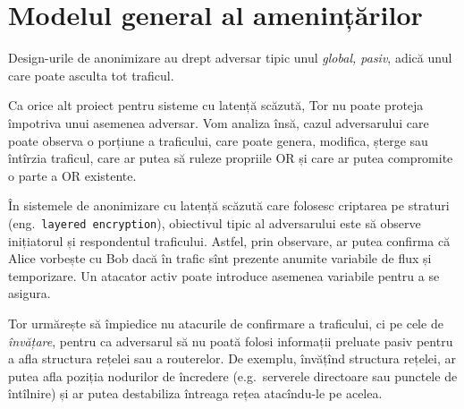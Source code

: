 
\section{Modelul general al amenințărilor}

\indent\indent Design-urile de anonimizare au drept adversar tipic
unul \emph{global, pasiv}, adică unul care poate asculta tot traficul.
 

Ca orice alt proiect pentru sisteme cu latență scăzută, Tor nu
poate proteja împotriva unui asemenea adversar. Vom analiza însă, cazul
adversarului care poate observa o porțiune a traficului, care poate genera,
modifica, șterge sau întîrzia traficul, care ar putea să ruleze propriile OR
și care ar putea compromite o parte a OR existente.

În sistemele de anonimizare cu latență scăzută care folosesc criptarea
pe straturi (eng.\ \texttt{layered encryption}), 
obiectivul tipic al adversarului este să observe inițiatorul și respondentul
traficului. Astfel, prin observare, ar putea confirma că Alice vorbește cu Bob
dacă în trafic sînt prezente anumite variabile de flux și temporizare.
Un atacator activ poate introduce asemenea variabile pentru a se asigura.

Tor urmărește să împiedice nu atacurile de confirmare a traficului, ci pe
cele de \emph{în\-vă\-ța\-re}, pentru ca adversarul să nu poată folosi informații
preluate pasiv pentru a afla structura rețelei sau a routerelor. De exemplu,
învățînd structura rețelei, ar putea afla poziția nodurilor de încredere (e.g.\
serverele directoare sau punctele de întîlnire)
și ar putea destabiliza întreaga rețea atacîndu-le pe acelea.
